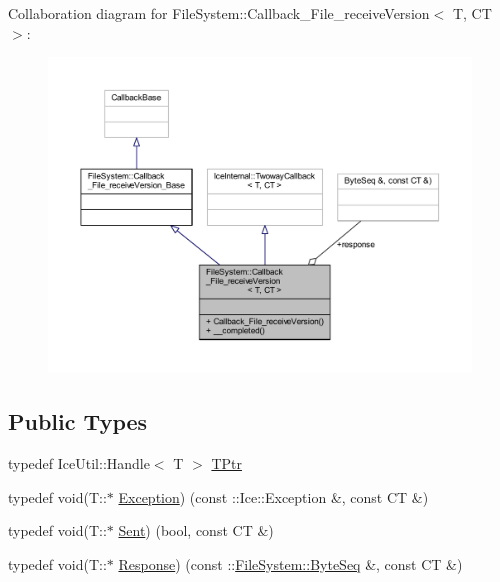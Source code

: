 Collaboration diagram for File\+System\+:\+:Callback\+\_\+\+File\+\_\+receive\+Version$<$ T, C\+T $>$\+:
\nopagebreak
\begin{figure}[H]
\begin{center}
\leavevmode
\includegraphics[width=350pt]{class_file_system_1_1_callback___file__receive_version__coll__graph}
\end{center}
\end{figure}
\subsection*{Public Types}
\begin{DoxyCompactItemize}
\item 
typedef Ice\+Util\+::\+Handle$<$ T $>$ \hyperlink{class_file_system_1_1_callback___file__receive_version_ad3c99b998d7a847dca7193dd3cad8cf1}{T\+Ptr}
\item 
typedef void(T\+::$\ast$ \hyperlink{class_file_system_1_1_callback___file__receive_version_a8ec034c43b3913243caf48c7de06f99d}{Exception}) (const \+::Ice\+::\+Exception \&, const C\+T \&)
\item 
typedef void(T\+::$\ast$ \hyperlink{class_file_system_1_1_callback___file__receive_version_a70f13401fd06a120da116b0b17ea67d0}{Sent}) (bool, const C\+T \&)
\item 
typedef void(T\+::$\ast$ \hyperlink{class_file_system_1_1_callback___file__receive_version_ab5743b6627d5fde356fc7381fcc4613a}{Response}) (const \+::\hyperlink{namespace_file_system_a5c85de065f9c451ae1d1dea2dacb68c5}{File\+System\+::\+Byte\+Seq} \&, const C\+T \&)
\end{DoxyCompactItemize}
